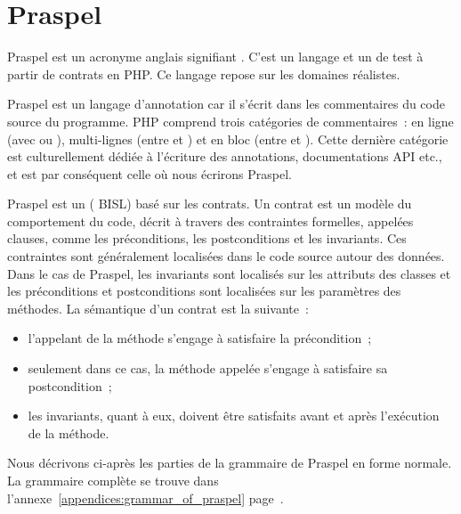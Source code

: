 \def\gsep{$\quad::=\quad$}
\def\mvert{$\;\;|\;\;$}
\def\mvertp{\phantom{$\;\;|\;\;$}}
\newcommand{\gtoken}[1]{\underline{\code{php-#1}}}
\newcommand{\grule}[1]{\textit{#1}}

\section{Praspel}
\label{section:language:praspel}

Praspel est un acronyme anglais signifiant . C'est un langage et un 
de test à partir de contrats en PHP. Ce langage repose sur les domaines
réalistes.

Praspel est un {\strong langage d'annotation} car il s'écrit dans les
commentaires du code source du programme. PHP comprend trois catégories de
commentaires~: en ligne (avec \code{//} ou \code{\#}), multi-lignes (entre
\code{/*} et \code{*/}) et en bloc (entre \code{/**} et \code{*/}). Cette
dernière catégorie est culturellement dédiée à l'écriture des annotations,
documentations API etc., et est par conséquent celle où nous écrirons Praspel.

Praspel est un  ({\strong
BISL}) basé sur les contrats. Un {\strong contrat} est un modèle du comportement
du code, décrit à travers des contraintes formelles, appelées {\strong clauses},
comme les préconditions, les postconditions et les invariants. Ces contraintes
sont généralement localisées dans le code source autour des données.  Dans le
cas de Praspel, les invariants sont localisés sur les attributs des classes et
les préconditions et postconditions sont localisées sur les paramètres des
méthodes. La sémantique d'un contrat est la suivante~:

\begin{itemize}

\item l'appelant de la méthode s'engage à satisfaire la précondition~;

\item seulement dans ce cas, la méthode appelée s'engage à satisfaire sa
postcondition~;

\item les invariants, quant à eux, doivent être satisfaits avant et après
l'exécution de la méthode.

\end{itemize}

Nous décrivons ci-après les parties de la grammaire de Praspel en forme normale.
La grammaire complète se trouve dans
l'annexe~\ref{appendices:grammar_of_praspel}
page~\pageref{appendices:grammar_of_praspel}.

